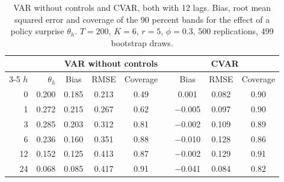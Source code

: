 \begin{table}[H]
\centering
\caption{VAR without controls and CVAR, both with 12 lags. Bias, root mean squared error and coverage of the 90 percent bands for the effect of a policy surprise $\theta_h$. $T=200$, $K=6$, $r=5$, $\phi=0.3$, 500 replications, 499 bootstrap draws.\label{tab:mc-var}}
\begin{tabular}{rr ccc c ccc}
\toprule
 & & \multicolumn{3}{c}{VAR without controls} & & \multicolumn{3}{c}{CVAR}\\
\cmidrule{3-5}\cmidrule{7-9}
$h$ & $\theta_h$ & Bias & RMSE & Coverage & & Bias & RMSE & Coverage\\
\midrule
0 & 0.200 & 0.185 & 0.213 & 0.49 & & 0.001 & 0.082 & 0.90\\
1 & 0.272 & 0.215 & 0.267 & 0.62 & & $-$0.005 & 0.097 & 0.90\\
3 & 0.285 & 0.203 & 0.312 & 0.81 & & $-$0.002 & 0.109 & 0.89\\
6 & 0.236 & 0.160 & 0.351 & 0.88 & & $-$0.010 & 0.128 & 0.86\\
12 & 0.152 & 0.125 & 0.413 & 0.87 & & $-$0.002 & 0.129 & 0.91\\
24 & 0.068 & 0.085 & 0.417 & 0.91 & & $-$0.041 & 0.084 & 0.82\\
\bottomrule
\end{tabular}
\end{table}
